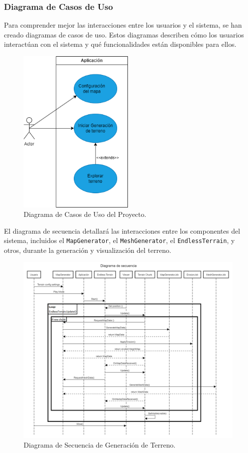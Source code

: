 \subsubsection{Diagrama de Casos de Uso}

Para comprender mejor las interacciones entre los usuarios y el sistema, se han creado diagramas de casos de uso. Estos diagramas describen cómo los usuarios interactúan con el sistema y qué funcionalidades están disponibles para ellos.

\begin{figure}[H]
    \centering
    \includegraphics[width=0.5\textwidth]{img/UseCases.png}
    \caption{Diagrama de Casos de Uso del Proyecto.}
\end{figure}


El diagrama de secuencia detallará las interacciones entre los componentes del sistema, incluidos el \texttt{MapGenerator}, el \texttt{MeshGenerator}, el \texttt{EndlessTerrain}, y otros, durante la generación y visualización del terreno.

\begin{figure}[H]
    \centering
    \includegraphics[width=1\textwidth]{img/Diagrama de secuencia.png}
    \caption{Diagrama de Secuencia de Generación de Terreno.}
\end{figure}


